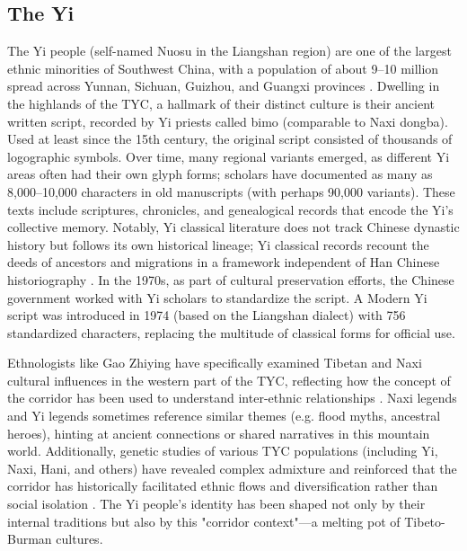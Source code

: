 \documentclass[11pt,a4paper,oneside]{report}
\begin{document}
\subsection{The Yi}
\noindent\hspace{1cm}
The Yi people (self-named Nuosu in the Liangshan region) are one of the largest ethnic minorities of Southwest China, with a population of about 9–10 million spread across Yunnan, Sichuan, Guizhou, and Guangxi provinces \cite{frechette_ways_2003}. Dwelling in the highlands of the TYC, a hallmark of their distinct culture is their ancient written script, recorded by Yi priests called bimo (comparable to Naxi dongba). Used at least since the 15th century, the original script consisted of thousands of logographic symbols. Over time, many regional variants emerged, as different Yi areas often had their own glyph forms; scholars have documented as many as 8,000–10,000 characters in old manuscripts (with perhaps 90,000 variants). These texts include scriptures, chronicles, and genealogical records that encode the Yi's collective memory. Notably, Yi classical literature does not track Chinese dynastic history but follows its own historical lineage; Yi classical records recount the deeds of ancestors and migrations in a framework independent of Han Chinese historiography \cite{li_building_2017}. In the 1970s, as part of cultural preservation efforts, the Chinese government worked with Yi scholars to standardize the script. A Modern Yi script was introduced in 1974 (based on the Liangshan dialect) with 756 standardized characters, replacing the multitude of classical forms for official use. 

Ethnologists like Gao Zhiying have specifically examined Tibetan and Naxi cultural influences in the western part of the TYC, reflecting how the concept of the corridor has been used to understand inter-ethnic relationships \cite{he_gao_2017}. Naxi legends and Yi legends sometimes reference similar themes (e.g. flood myths, ancestral heroes), hinting at ancient connections or shared narratives in this mountain world. Additionally, genetic studies of various TYC populations (including Yi, Naxi, Hani, and others) have revealed complex admixture and reinforced that the corridor has historically facilitated ethnic flows and diversification rather than social isolation \cite{zhang_tibetan-yi_2022}. The Yi people's identity has been shaped not only by their internal traditions but also by this "corridor context"—a melting pot of Tibeto-Burman cultures.
\end{document}
